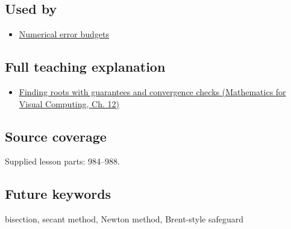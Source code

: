 \subsection{Used by}\label{appendix-f63eb850796d-used-by}

\begin{itemize}
\tightlist
\item
  \hyperref[appendix-31b8c295e05f]{Numerical error budgets}
\end{itemize}

\subsection{Full teaching explanation}\label{appendix-f63eb850796d-full-teaching-explanation}

\begin{itemize}
\tightlist
\item
  \href{../02-Mathematics-for-Visual-Computing/main.pdf\#nameddest=02-foundations-ii-ch028-finding-roots-with-guarantees-and-convergence-checks}{Finding roots with guarantees and convergence checks (Mathematics for Visual Computing, Ch. 12)}
\end{itemize}

\subsection{Source coverage}\label{appendix-f63eb850796d-source-coverage}

Supplied lesson parts: 984--988.

\subsection{Future keywords}\label{appendix-f63eb850796d-future-keywords}

bisection, secant method, Newton method, Brent-style safeguard
